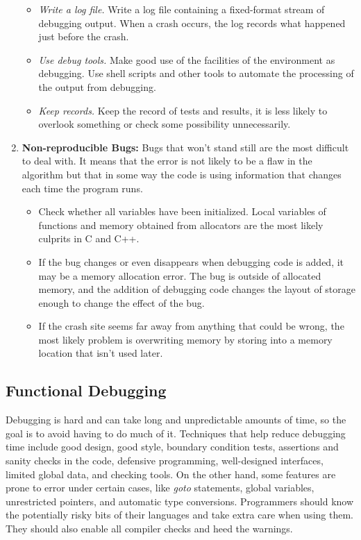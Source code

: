 \documentclass[draftclsnofoot,journal,onecolumn,12pt]{IEEEtran}
\begin{document}
\begin{enumerate}
\begin{itemize}
    \item \textit{Write a log file.} Write a log file containing a fixed-format stream of debugging output. When a crash occurs, the log records what happened just before the crash.
    \item \textit{Use debug tools.} Make good use of the facilities of the environment as debugging. Use shell scripts and other tools to automate the processing of the output from debugging.
    \item \textit{Keep records.} Keep the record of tests and results, it is less likely to overlook something or check some possibility unnecessarily.
    \end{itemize}
  \item \textbf{Non-reproducible Bugs:} Bugs that won't stand still are the most difficult to deal with. It means that the error is not likely to be a flaw in the algorithm but that in some way the code is using information that changes each time the program runs.
      \begin{itemize}
        \item Check whether all variables have been initialized. Local variables of functions and memory obtained from allocators are the most likely culprits in C and C++.
        \item If the bug changes or even disappears when debugging code is added, it may be a memory allocation error. The bug is outside of allocated memory, and the addition of debugging code changes the layout of storage enough to change the effect of the bug.
        \item If the crash site seems far away from anything that could be wrong, the most likely problem is overwriting memory by storing into a memory location that isn't used later.
      \end{itemize}
\end{enumerate}

\subsection{Functional Debugging}

Debugging is hard and can take long and unpredictable amounts of time, so the goal is to avoid having to do much of it. Techniques that help reduce debugging time include good design, good style, boundary condition tests, assertions and sanity checks in the code, defensive programming, well-designed interfaces, limited global data, and checking tools. On the other hand, some features are prone to error under certain cases, like \textit{goto} statements, global variables, unrestricted pointers, and automatic type conversions. Programmers should know the potentially risky bits of their languages and take extra care when using them. They should also enable all compiler checks and heed the warnings.
\end{document}
